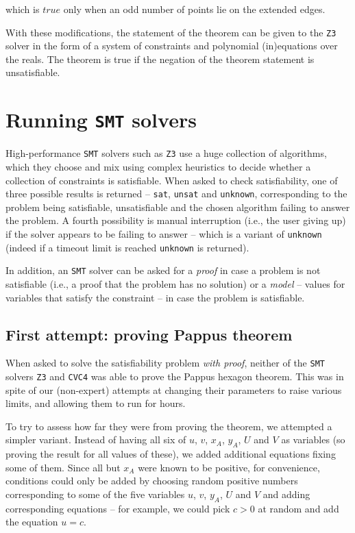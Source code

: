 \documentclass{amsart}
\theoremstyle{plain}
\theoremstyle{definition}
\theoremstyle{remark}
\begin{document}
which is \(true\) only when an odd number of points lie on the extended edges.

With these modifications, the statement of the theorem can be given to the \texttt{Z3} solver in the form of a system of constraints and polynomial (in)equations over the reals.
The theorem is true if the negation of the theorem statement is unsatisfiable.

\section{Running \texttt{SMT} solvers}\label{running-smt-solvers}

High-performance \texttt{SMT} solvers such as \texttt{Z3} use a huge collection of algorithms, which they
choose and mix using complex heuristics to decide whether a collection
of constraints is satisfiable. When asked to check satisfiability, one of three possible
results is returned -- \texttt{sat}, \texttt{unsat} and \texttt{unknown}, corresponding to
the problem being satisfiable, unsatisfiable and the chosen algorithm failing to answer
the problem. A fourth possibility is manual interruption (i.e., the user giving up) if the solver appears to be failing
to answer -- which is a variant of \texttt{unknown} (indeed if a timeout limit is reached \texttt{unknown} is returned).

In addition, an \texttt{SMT} solver can be asked for a
\emph{proof} in case a problem is not satisfiable (i.e., a proof that
the problem has no solution) or a \emph{model} -- values for variables
that satisfy the constraint -- in case the problem is satisfiable.

\subsection{First attempt: proving Pappus theorem}

When asked to solve the satisfiability problem \emph{with proof},
neither of the \texttt{SMT} solvers \texttt{Z3} and \texttt{CVC4} was able to
prove the Pappus hexagon theorem. This was in spite of our (non-expert)
attempts at changing their parameters to raise various limits,
and allowing them to run for hours.

To try to assess how far they were from proving the theorem, we attempted
a simpler variant. Instead of having all six of \(u\), \(v\), \(x_A\),
\(y_A\), \(U\) and \(V\) as variables (so proving the result for all
values of these), we added additional equations fixing some of them.
Since all but \(x_A\) were known to be positive, for convenience,
conditions could only be added by choosing random positive numbers
corresponding to some of the five variables \(u\), \(v\), \(y_A\), \(U\)
and \(V\) and adding corresponding equations -- for example, we could
pick \(c > 0\) at random and add the equation \(u = c\).
\end{document}
